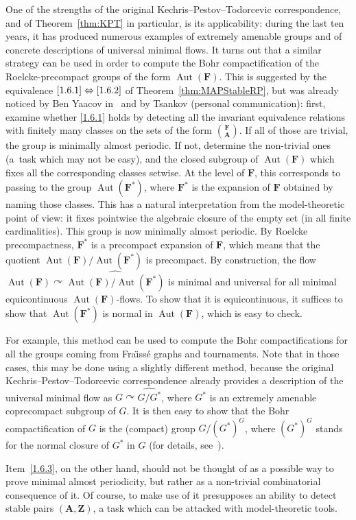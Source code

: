 \documentclass[11pt]{article}
\theoremstyle{definition}
\numberwithin{equation}{section}
\numberwithin{figure}{section}
\numberwithin{table}{section}
\newcommand*{\mA}{\mathbf{A}}
\newcommand*{\mF}{\mathbf{F}}
\newcommand*{\mZ}{\mathbf{Z}}
\DeclareMathOperator{\Aut}{Aut}
\newcommand{\actson}{\curvearrowright}
\begin{document}
One of the strengths of the original Kechris--Pestov--Todorcevic correspondence, and of Theorem~\ref{thm:KPT} in particular, is its applicability: during the last ten years, it has produced numerous examples of extremely amenable groups and of concrete descriptions of universal minimal flows. It turns out that a similar strategy can be used in order to compute the Bohr compactification of the Roelcke-precompact groups of the form $\Aut(\mF)$. This is suggested by the equivalence $\eqref{1.6.1}\Leftrightarrow \eqref{1.6.2}$ of Theorem~\ref{thm:MAPStableRP}, but was already noticed by Ben Yaacov in~\cite{BY} and by Tsankov (personal communication): first, examine whether \eqref{1.6.1} holds by detecting all the invariant equivalence relations with finitely many classes on the sets of the form $\binom{\mF}{\mA}$. If all of those are trivial, the group is minimally almost periodic. If not, determine the non-trivial ones (a~task which may not be easy), and the closed subgroup of $\Aut(\mF)$ which fixes all the corresponding classes setwise. At the level of $\mF$, this corresponds to passing to the group $\Aut(\mF^{*})$, where $\mF^{*}$ is the expansion of $\mF$ obtained by naming those classes. This has a natural interpretation from the model-theoretic point of view: it fixes pointwise the algebraic closure of the empty set (in all finite cardinalities). This group is now minimally almost periodic. By Roelcke precompactness, $\mF^{*}$ is a precompact expansion of $\mF$, which means that the quotient $\Aut(\mF)/\Aut(\mF^{*})$ is precompact. By construction, the flow $\Aut(\mF) \actson \widehat{\Aut(\mF)/\Aut(\mF^{*})}$ is minimal and universal for all minimal equicontinuous $\Aut(\mF)$-flows. To show that it is equicontinuous, it suffices to show that $\Aut(\mF^{*})$ is normal in $\Aut(\mF)$, which is easy to check.

For example, this method can be used to compute the Bohr compactifications for all the groups coming from Fra\"{\i}ss\'e graphs and tournaments. Note that in those cases, this may be done using a slightly different method, because the original Kechris--Pestov--Todorcevic correspondence already provides a description of the universal minimal flow as $G\actson \widehat{G/G^{*}}$, where $G^{*}$ is an extremely amenable coprecompact subgroup of $G$. It is then easy to show that the Bohr compactification of $G$ is the (compact) group $G/(G^{*})^{G}$, where $(G^{*})^{G}$ stands for the normal closure of $G^{*}$ in $G$ (for details, see~\cite{NVT8}).

Item~\eqref{1.6.3}, on the other hand, should not be thought of as a possible way to prove minimal almost periodicity, but rather as a non-trivial combinatorial consequence of it. Of course, to make use of it presupposes an ability to detect stable pairs $(\mA, \mZ)$, a task which can be attacked with model-theoretic tools.
\end{document}
